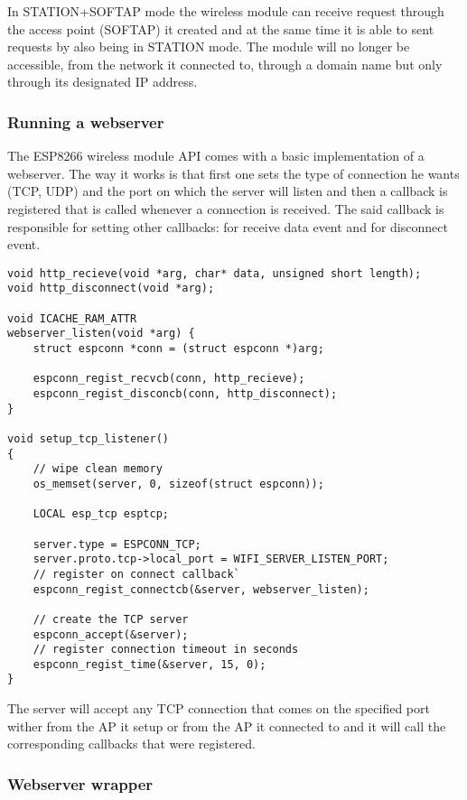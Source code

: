 In STATION+SOFTAP mode the wireless module can receive request through the access point (SOFTAP) it created
and at the same time it is able to sent requests by also being in STATION mode. The module will no longer be
accessible, from the network it connected to, through a domain name but only through its designated IP
address.

\subsubsection{Running a webserver}

\qquad The ESP8266 wireless module API comes with a basic implementation of a webserver. The way it works is that
first one sets the type of connection he wants (TCP, UDP) and the port on which the server will listen and
then a callback is registered that is called whenever a connection is received. The said callback is
responsible for setting other callbacks: for receive data event and for disconnect event.

\begin{lstlisting}[frame=single]
void http_recieve(void *arg, char* data, unsigned short length);
void http_disconnect(void *arg);

void ICACHE_RAM_ATTR
webserver_listen(void *arg) {
    struct espconn *conn = (struct espconn *)arg;

    espconn_regist_recvcb(conn, http_recieve);
    espconn_regist_disconcb(conn, http_disconnect);
}

void setup_tcp_listener()
{
    // wipe clean memory
    os_memset(server, 0, sizeof(struct espconn));

    LOCAL esp_tcp esptcp;

    server.type = ESPCONN_TCP;
    server.proto.tcp->local_port = WIFI_SERVER_LISTEN_PORT;
    // register on connect callback`
    espconn_regist_connectcb(&server, webserver_listen);

    // create the TCP server
    espconn_accept(&server);
    // register connection timeout in seconds
    espconn_regist_time(&server, 15, 0);
}
\end{lstlisting}

The server will accept any TCP connection that comes on the specified port wither from the AP it setup or from
the AP it connected to and it will call the corresponding callbacks that were registered.

\subsubsection{Webserver wrapper}

